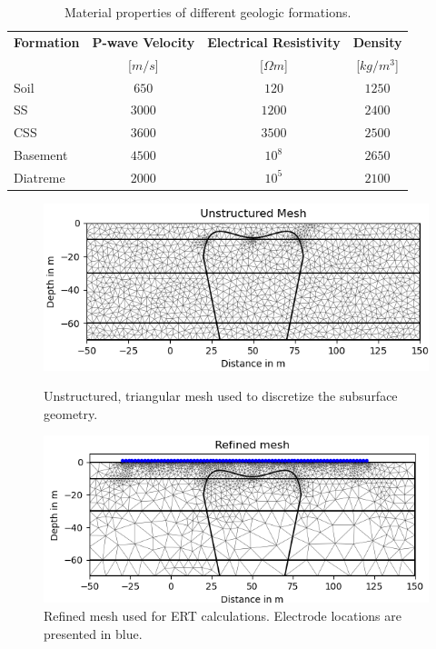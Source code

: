 \begin{table}[]
\caption{Material properties of different geologic formations.}
\centering
\begin{tabular}{lccc}
\hline 
\textbf{Formation} & \textbf{P-wave Velocity}  & \textbf{Electrical Resistivity}  & \textbf{Density}  \\
& [$m/s$]  & [$\Omega m$]  & [$kg/m^3$]\\ \hline 
Soil & $650$ & $120$ & $1250$\\
SS & $3000$ & $1200$ & $2400$\\
CSS & $3600$ & $3500$ & $2500$\\
Basement & $4500$ & $10^8$ & $2650$\\
Diatreme & $2000$ & $10^5$ & $2100$\\
 \hline 
\end{tabular}
\label{table:properties}
\end{table}


\begin{figure}[]
  \centering
  \begin{minipage}[b]{0.49\textwidth}
    \includegraphics[width=\textwidth]{Figures/Mesh.png}
    \caption[Unstructured mesh]{Unstructured, triangular mesh used to discretize the subsurface geometry.}
    \label{figure:mesh}
  \end{minipage}
  \hfill
  \begin{minipage}[b]{0.49\textwidth}
    \includegraphics[width=\textwidth]{Figures/ERT_refined_mesh.png}
    \caption[Refined mesh used for ERT calculations]{Refined mesh used for ERT calculations. Electrode locations are presented in blue.}
    \label{figure:refined_mesh}
  \end{minipage}
\end{figure}

